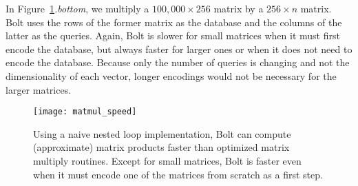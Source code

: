 In Figure~\ref{fig:matmul_speed}\textit{.bottom}, we multiply a $100,000 \times 256$ matrix by a $256 \times n$ matrix. Bolt uses the rows of the former matrix as the database and the columns of the latter as the queries. Again, Bolt is slower for small matrices when it must first encode the database, but always faster for larger ones or when it does not need to encode the database. Because only the number of queries is changing and not the dimensionality of each vector, longer encodings would not be necessary for the larger matrices.


\begin{figure}[h]
\begin{center}
\label{fig:matmul_speed}
\texttt{[image: matmul\_speed]}
\caption{Using a naive nested loop implementation, Bolt can compute (approximate) matrix products faster than optimized matrix multiply routines. Except for small matrices, Bolt is faster even when it must encode one of the matrices from scratch as a first step.}
\end{center}
\end{figure}







